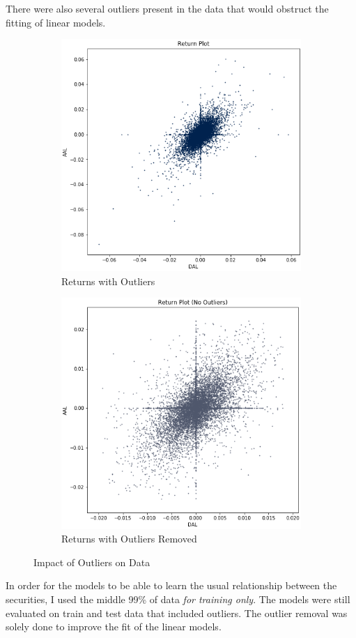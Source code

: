 \documentclass{article}
\begin{document}
There were
also several outliers present in the data that would obstruct the fitting of linear models. 
\begin{figure}[h!]
  \centering
  \begin{subfigure}{.5\textwidth}
    \centering
    \includegraphics[width=.95\linewidth]{../Figures/return_plot_out.png}
    \caption{Returns with Outliers}
  \end{subfigure}%
  \begin{subfigure}{.5\textwidth}
    \centering
    \includegraphics[width=.95\linewidth]{../Figures/return_plot_no_out.png}
    \caption{Returns with Outliers Removed}
  \end{subfigure}
  \caption{Impact of Outliers on Data}
\end{figure}
In order for the models to be able to learn the usual relationship between the securities, I used
the middle 99\% of data \textit{for training only}. The models were still evaluated on train and
test data that included outliers. The outlier removal was solely done to improve the fit of the
linear models.
\end{document}
